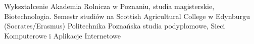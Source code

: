 \begin{rubric}{Wykształcenie}
\entry*[2001 -- 2006]Akademia Rolnicza w Poznaniu, studia magisterskie,
	Biotechnologia.
Semestr studiów na Scottish Agricultural
College w Edynburgu (Socrates/Erasmus)
Politechnika Poznańska studia podyplomowe, Sieci
Komputerowe i Aplikacje Internetowe
\end{rubric}
